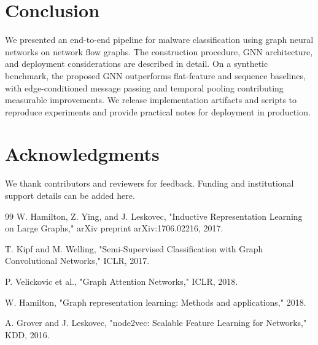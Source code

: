 \documentclass[conference]{IEEEtran}
\begin{document}
\section{Conclusion}

We presented an end-to-end pipeline for malware classification using graph neural networks on network flow graphs. The construction procedure, GNN architecture, and deployment considerations are described in detail. On a synthetic benchmark, the proposed GNN outperforms flat-feature and sequence baselines, with edge-conditioned message passing and temporal pooling contributing measurable improvements. We release implementation artifacts and scripts to reproduce experiments and provide practical notes for deployment in production.

\section*{Acknowledgments}

We thank contributors and reviewers for feedback. Funding and institutional support details can be added here.

\begin{thebibliography}{99}
W. Hamilton, Z. Ying, and J. Leskovec, "Inductive Representation Learning on Large Graphs," arXiv preprint arXiv:1706.02216, 2017.

T. Kipf and M. Welling, "Semi-Supervised Classification with Graph Convolutional Networks," ICLR, 2017.

P. Velickovic et al., "Graph Attention Networks," ICLR, 2018.

W. Hamilton, "Graph representation learning: Methods and applications," 2018.

A. Grover and J. Leskovec, "node2vec: Scalable Feature Learning for Networks," KDD, 2016.

\end{thebibliography}
\end{document}

